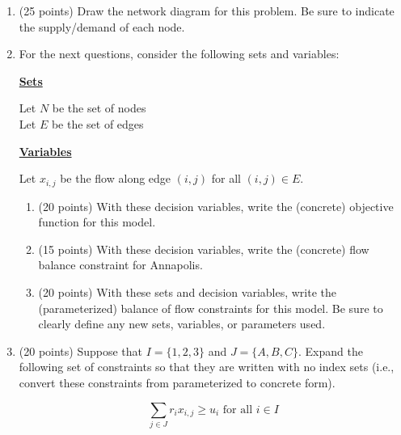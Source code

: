 \documentclass[letterpaper,oneside,12pt]{article}%
\begin{document}
\begin{enumerate}
\item (25 points) Draw the network diagram for this problem. Be sure to indicate the supply/demand of each node. \newpage

\item For the next questions, consider the following sets and variables:

\textbf{\underline{Sets}} 

Let $N$ be the set of nodes \\
Let $E$ be the set of edges

\textbf{\underline{Variables}} 

Let $x_{i,j}$ be the flow along edge $(i,j)$ for all $(i,j) \in E$.

	\begin{enumerate}
	\item (20 points) With these decision variables, write the (concrete) objective function for this model. \vspace{1.5in}
	\item (15 points) With these decision variables, write the (concrete) flow balance constraint for Annapolis. \vspace{1in}
	\item (20 points) With these sets and decision variables, write the (parameterized) balance of flow constraints for this model. Be sure to clearly define any new sets, variables, or parameters used.  \vspace{1.5in}
	\end{enumerate}
\item (20 points) Suppose that $I = \{1,2,3\}$ and $J = \{A,B,C\}$. Expand the following set of constraints so that they are written with no index sets (i.e., convert these constraints from parameterized to concrete form).

\[
\sum_{j \in J} r_i x_{i,j} \geq u_i \text{ for all $i \in I$}
\]

\end{enumerate}
\end{document}
